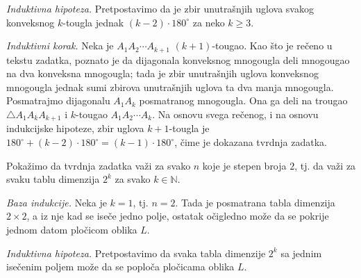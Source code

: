 {\it Induktivna hipoteza.} Pretpostavimo da je zbir unutra\v snjih uglova svakog konveksnog $k$-tougla jednak $(k-2)\cdot 180^\circ$ za neko $k\geq 3$.

\begin{center}
\end{center}

{\it Induktivni korak.} Neka je $A_1A_2\cdots A_{k+1}$ $(k+1)$-tougao. Kao \v sto je re\v ceno u tekstu zadatka, poznato je da dijagonala konveksnog mnogougla deli mnogougao na dva konveksna mnogougla; tada je zbir unutra\v snjih uglova konveksnog mnogougla jednak sumi zbirova unutra\v snjih uglova ta dva manja mnogougla. Posmatrajmo dijagonalu $A_1A_k$ posmatranog mnogougla. Ona ga deli na trougao $\triangle A_1A_kA_{k+1}$ i $k$-tougao $A_1A_2\cdots A_k$. Na osnovu svega re\v cenog, i na osnovu indukcijske hipoteze, zbir uglova $k+1$-tougla je $180^\circ+(k-2)\cdot 180^\circ=(k-1)\cdot 180^\circ$, \v cime je dokazana tvrdnja zadatka.

Poka\v zimo da tvrdnja zadatka va\v zi za svako $n$ koje je stepen broja $2$, tj. da va\v zi za svaku tablu dimenzija $2^k$ za svako $k\in\mathbb N$.

{\it Baza indukcije.} Neka je $k=1$, tj. $n=2$. Tada je posmatrana tabla dimenzija $2\times 2$, a iz nje kad se ise\v ce jedno polje, ostatak o\v cigledno mo\v ze da se pokrije jednom datom plo\v cicom oblika $L$.

{\it Induktivna hipoteza.} Pretpostavimo da svaka tabla dimenzije $2^k$ sa jednim ise\v cenim poljem mo\v ze da se poplo\v ca plo\v cicama oblika $L$.

